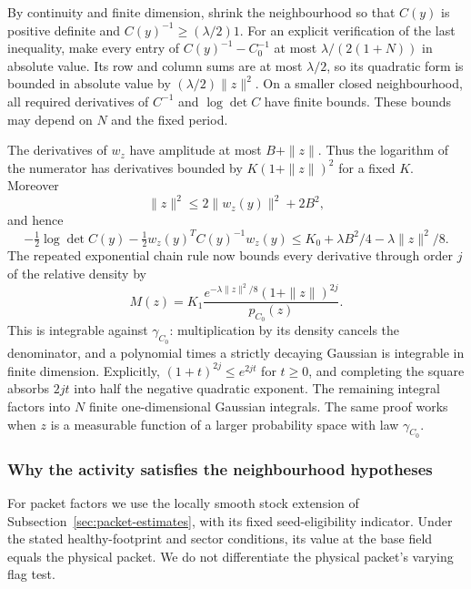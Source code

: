 By continuity and finite dimension, shrink the neighbourhood so
that $C(y)$ is positive definite and
$C(y)^{-1}\ge(\lambda/2)1$. For an explicit verification of the
last inequality, make every entry of $C(y)^{-1}-C_0^{-1}$ at most
$\lambda/(2(1+N))$ in absolute value. Its row and column sums are
at most $\lambda/2$, so its quadratic form is bounded in absolute
value by $(\lambda/2)\|z\|^2$. On a smaller closed neighbourhood,
all required derivatives of $C^{-1}$ and $\log\det C$ have finite
bounds. These bounds may depend on $N$ and the fixed period.

The derivatives of $w_z$ have amplitude at most $B+\|z\|$.
Thus the logarithm of the numerator has derivatives bounded by
$K(1+\|z\|)^2$ for a fixed $K$. Moreover
\[
 \|z\|^2\le2\|w_z(y)\|^2+2B^2,
\]
and hence
\[
 -\tfrac12\log\det C(y)
       -\tfrac12 w_z(y)^TC(y)^{-1}w_z(y)
 \le K_0+\lambda B^2/4-\lambda\|z\|^2/8.
\]
The repeated exponential chain rule now bounds every derivative
through order $j$ of the relative density by
\begin{equation}\label{eq:gaussian-open-envelope}
 M(z)=K_1\frac{e^{-\lambda\|z\|^2/8}
                         (1+\|z\|)^{2j}}{p_{C_0}(z)}.
\end{equation}
This is integrable against $\gamma_{C_0}$: multiplication by its
density cancels the denominator, and a polynomial times a strictly
decaying Gaussian is integrable in finite dimension. Explicitly,
$(1+t)^{2j}\le e^{2jt}$ for $t\ge0$, and completing the square
absorbs $2jt$ into half the negative quadratic exponent. The
remaining integral factors into $N$ finite one-dimensional Gaussian
integrals. The same proof works when $z$ is a measurable function
of a larger probability space with law $\gamma_{C_0}$.

\subsubsection{Why the activity satisfies the neighbourhood hypotheses}
For packet factors we use the locally smooth stock extension of
Subsection~\ref{sec:packet-estimates}, with its fixed seed-eligibility
indicator. Under the stated healthy-footprint and sector conditions,
its value at the base field equals the physical packet. We do not
differentiate the physical packet's varying flag test.

